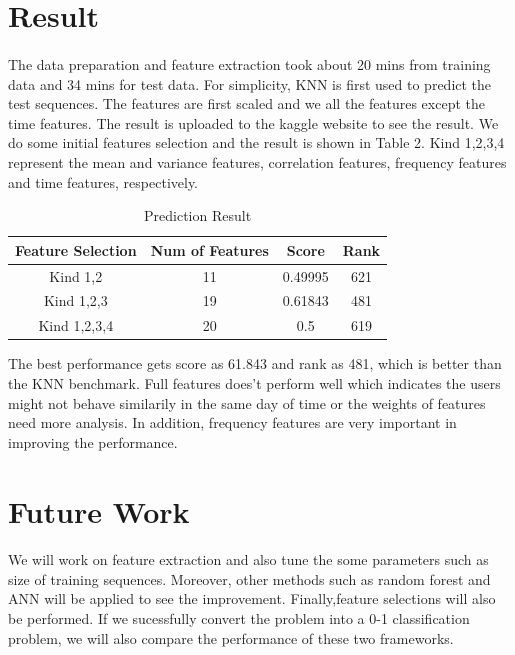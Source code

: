 \documentclass{article}
\begin{document}
	\section{Result} %
	\label{sec:result}
	\paragraph{} The data preparation and feature extraction took about 20 mins from training data and 34 mins for test data. For simplicity, KNN is first used to predict the test sequences. The features are first scaled and we all the features except the time features. The result is uploaded to the kaggle website to see the result. We do some initial features selection and the result is shown in Table 2. Kind 1,2,3,4 represent the mean and variance features, correlation features, frequency features and time features, respectively.
	\begin{table}
		\centering
		\caption{Prediction Result}
		\begin{tabular}{c|c|c|c}
			Feature Selection & Num of Features & Score & Rank \\ \hline
			Kind 1,2 & 11 & 0.49995 & 621 \\ 
			Kind 1,2,3 & 19 & 0.61843 & 481 \\ 
			Kind 1,2,3,4 & 20 & 0.5 & 619 \\
		\end{tabular}
	\end{table}
	The best performance gets score as 61.843 and rank as 481, which is better than the KNN benchmark. Full features does't perform well which indicates the users might not behave similarily in the same day of time or the weights of features need more analysis. In addition, frequency features are very important in improving the performance. 
	
	
	\section{Future Work} %
	\label{sec:future_work}
	\paragraph{} We will work on feature extraction and also tune the some parameters such as size of training sequences. Moreover, other methods such as random forest and ANN will be applied to see the improvement. Finally,feature selections will also be performed. If we sucessfully convert the problem into a 0-1 classification problem, we will also compare the performance of these two frameworks.
	
\end{document}
